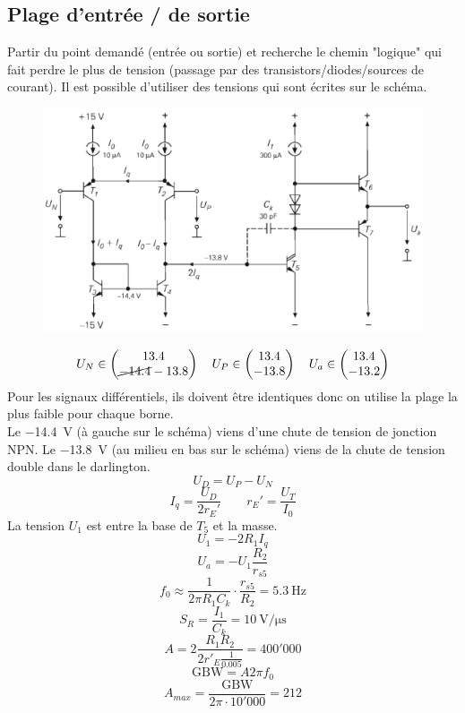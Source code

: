 \documentclass[resume]{subfiles}
\begin{document}
\begin{multicols}{3}
\subsection{Plage d'entrée / de sortie}
Partir du point demandé (entrée ou sortie) et recherche le chemin "logique" qui fait perdre le plus de tension (passage par des transistors/diodes/sources de courant). Il est possible d'utiliser des tensions qui sont écrites sur le schéma.
\begin{figure}[H]
\centering
\includegraphics[width=\columnwidth]{img_52.png}
\end{figure}
$$U_N\in\begin{pmatrix}13.4\\ \cancel{-14.4}-13.8\end{pmatrix}\quad U_P\in\begin{pmatrix}13.4\\-13.8\end{pmatrix}\quad U_a\in\begin{pmatrix}13.4\\-13.2\end{pmatrix}$$
Pour les signaux différentiels, ils doivent être identiques donc on utilise la plage la plus faible pour chaque borne.\\
Le \SI{-14.4}{\volt} (à gauche sur le schéma) viens d'une chute de tension de jonction NPN. Le \SI{-13.8}{\volt} (au milieu en bas sur le schéma) viens de la chute de tension double dans le darlington.
$$U_D=U_P-U_N$$
$$I_q=\frac{U_D}{2r_E'}\qquad r_E'=\frac{U_T}{I_0}$$
La tension $U_1$ est entre la base de $T_5$ et la masse.
$$U_1=-2R_1I_q$$
$$U_a=-U_1\frac{R_2}{r_{s5}}$$
$$f_0\approx \frac{1}{2\pi R_1C_k}\cdot \frac{r_{s5}}{R_2}=\SI{5.3}{\hertz}$$
$$S_R=\frac{I_1}{C_k}=\SI{10}{\volt\per\micro\second}$$
$$A=2\frac{R_1R_2}{2r'_E\frac{1}{0.005}}=400'000$$
$$\text{GBW}=A2\pi f_0$$
$$A_{max}=\frac{\text{GBW}}{2\pi \cdot 10'000}=212$$

\end{multicols}
\end{document}
